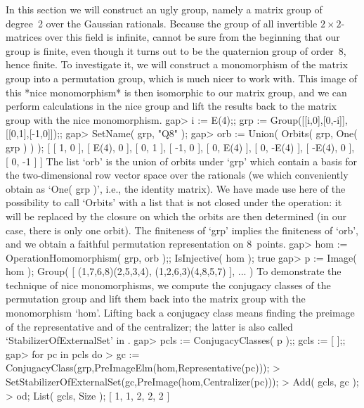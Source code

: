 
In this section we will construct an ugly group, namely a matrix group of
degree~2 over the Gaussian rationals. Because the group of all invertible
$2\times 2$-matrices over this  field is infinite,  {\GAP} cannot be sure
from the beginning that our group is finite, even though  it turns out to
be the quaternion  group of order~8, hence  finite. To investigate it, we
will construct  a  monomorphism of  the matrix  group into a  permutation
group, which  is much   nicer  to work with.  This   image of this  *nice
monomorphism* is then isomorphic to our  matrix group, and we can perform
calculations in the nice  group and lift the  results back to the  matrix
group with the nice monomorphism.
\beginexample
    gap> i := E(4);; grp := Group([[i,0],[0,-i]],[[0,1],[-1,0]]);;
    gap> SetName( grp, "Q8" );
    gap> orb := Union( Orbits( grp, One( grp ) ) );
    [ [ 1, 0 ], [ E(4), 0 ], [ 0, 1 ], [ -1, 0 ], [ 0, E(4) ],
        [ 0, -E(4) ], [ -E(4), 0 ], [ 0, -1 ] ]
\endexample
The list `orb' is the  union of orbits under `grp'  which contain a basis
for the  two-dimensional row  vector space over   the rationals (we which
conveniently obtain as `One( grp )',  i.e., the identity matrix). We have
made use here of the possibility to call `Orbits' with a list that is not
closed under the operation:  it will be replaced by  the closure on which
the orbits  are then determined (in our  case, there  is only one orbit).
The finiteness of `grp' implies the finiteness of `orb',  and we obtain a
faithful permutation representation on 8~points.
\beginexample
    gap> hom := OperationHomomorphism( grp, orb );; IsInjective( hom );
    true
    gap> p := Image( hom );
    Group( [ (1,7,6,8)(2,5,3,4), (1,2,6,3)(4,8,5,7) ], ... )
\endexample
To   demonstrate  the technique of  nice    monomorphisms, we compute the
conjugacy classes of  the permutation group and  lift them back  into the
matrix group with the monomorphism `hom'.  Lifting back a conjugacy class
means finding the preimage of  the representative and of the centralizer;
the latter is also called `StabilizerOfExternalSet' in {\GAP}.
\beginexample
    gap> pcls := ConjugacyClasses( p );; gcls := [  ];;
    gap> for pc  in pcls  do
    >      gc := ConjugacyClass(grp,PreImageElm(hom,Representative(pc)));
    >      SetStabilizerOfExternalSet(gc,PreImage(hom,Centralizer(pc)));
    >      Add( gcls, gc );
    >    od; List( gcls, Size );
    [ 1, 1, 2, 2, 2 ]
\endexample

